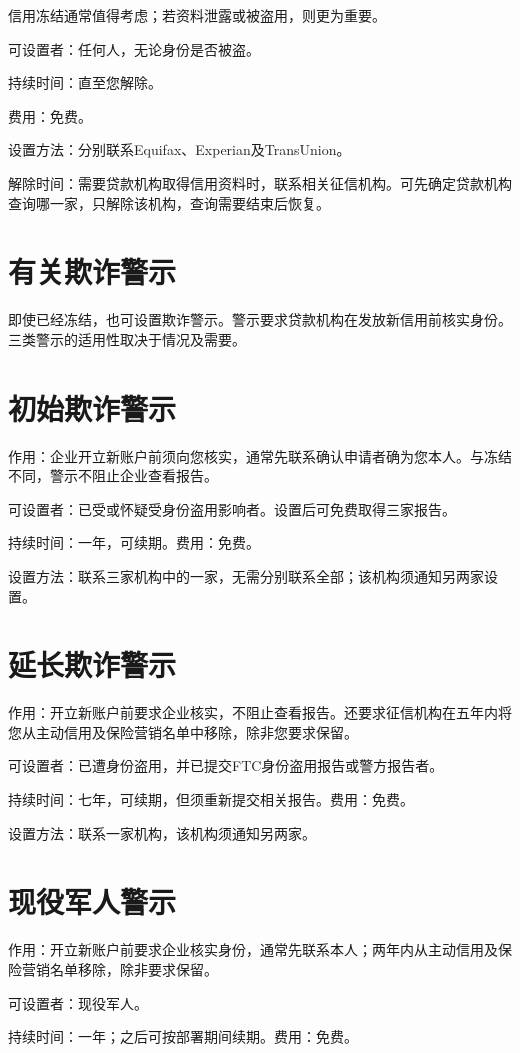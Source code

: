 \documentclass[UTF8,fontset=none,11pt,a4paper]{ctexart}
\begin{document}
信用冻结通常值得考虑；若资料泄露或被盗用，则更为重要。


可设置者：任何人，无论身份是否被盗。


持续时间：直至您解除。


费用：免费。


设置方法：分别联系Equifax、Experian及TransUnion。


解除时间：需要贷款机构取得信用资料时，联系相关征信机构。可先确定贷款机构查询哪一家，只解除该机构，查询需要结束后恢复。


\section*{有关欺诈警示}
即使已经冻结，也可设置欺诈警示。警示要求贷款机构在发放新信用前核实身份。三类警示的适用性取决于情况及需要。


\section*{初始欺诈警示}
作用：企业开立新账户前须向您核实，通常先联系确认申请者确为您本人。与冻结不同，警示不阻止企业查看报告。


可设置者：已受或怀疑受身份盗用影响者。设置后可免费取得三家报告。


持续时间：一年，可续期。费用：免费。


设置方法：联系三家机构中的一家，无需分别联系全部；该机构须通知另两家设置。


\section*{延长欺诈警示}
作用：开立新账户前要求企业核实，不阻止查看报告。还要求征信机构在五年内将您从主动信用及保险营销名单中移除，除非您要求保留。


可设置者：已遭身份盗用，并已提交FTC身份盗用报告或警方报告者。


持续时间：七年，可续期，但须重新提交相关报告。费用：免费。


设置方法：联系一家机构，该机构须通知另两家。


\section*{现役军人警示}
作用：开立新账户前要求企业核实身份，通常先联系本人；两年内从主动信用及保险营销名单移除，除非要求保留。


可设置者：现役军人。


持续时间：一年；之后可按部署期间续期。费用：免费。
\end{document}
